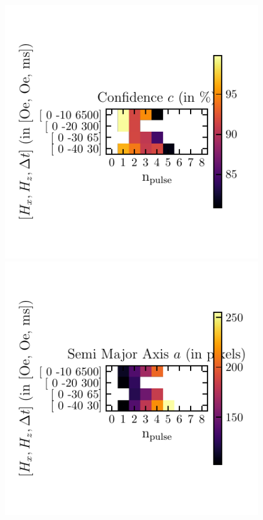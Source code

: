 \documentclass[12pt, twoside, a4paper]{article}
\begin{document}
\begin{figure}[!htbp]
	\centering
	\includegraphics[scale=1.0]{figures/11_FitsSubSpace/0_5_10_15__Confidence.pdf}\\
	\includegraphics[scale=1.0]{figures/11_FitsSubSpace/0_5_10_15__Semi-Major-Axis.pdf}

\end{figure}
\end{document}
